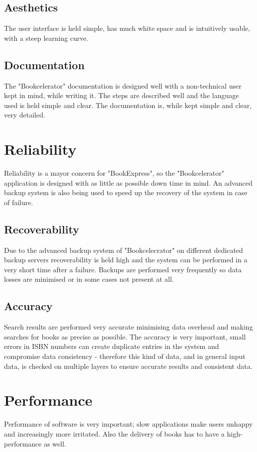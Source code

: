 \documentclass[11pt,a4paper,oneside,svgnames]{report}
\begin{document}
\subsection{Aesthetics}
The user interface is held simple, has much white space and is intuitively usable, with a steep learning curve.

\subsection{Documentation}
The "Bookcelerator" documentation is designed well with a non-technical user kept in mind, while writing it. The steps are described well and the language used is held simple and clear. The documentation is, while kept simple and clear, very detailed.


\section{Reliability}
Reliability is a mayor concern for "BookExpress", so the "Bookcelerator" application is designed with as little as possible down time in mind. An advanced backup system is also being used to speed up the recovery of the system in case of failure.

\subsection{Recoverability}
Due to the advanced backup system of "Bookcelecrator" on different dedicated backup servers recoverability is held high and the system can be performed in a very short time after a failure. Backups are performed very frequently so data losses are minimised or in some cases not present at all.

\subsection{Accuracy}
Search results are performed very accurate minimising data overhead and making searches for books as precise as possible. The accuracy is very important, small errors in ISBN numbers can create duplicate entries in the system and compromise data consistency - therefore this kind of data, and in general input data, is checked on multiple layers to ensure accurate results and consistent data.

\section{Performance}
Performance of software is very important; slow applications make users unhappy and increasingly more irritated. Also the delivery of books has to have a high-performance as well.
\end{document}
